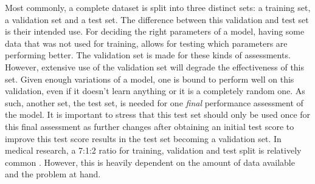 Most commonly, a complete dataset is split into three distinct sets: a training set, a validation set and a test set.
The difference between this validation and test set is their intended use.
For deciding the right parameters of a model, having some data that was not used for training, allows for testing which parameters are performing better.
The validation set is made for these kinds of assessments.
However, extensive use of the validation set will degrade the effectiveness of this set.
Given enough variations of a model, one is bound to perform well on this validation, even if it doesn't learn anything or it is a completely random one.
As such, another set, the test set, is needed for one \textit{final} performance assessment of the model.
It is important to stress that this test set should only be used once for this final assessment as further changes after obtaining an initial test score to improve this test score results in the test set becoming a validation set.
In medical research, a 7:1:2 ratio for training, validation and test split is relatively common \citep{attia}.
However, this is heavily dependent on the amount of data available and the problem at hand.

